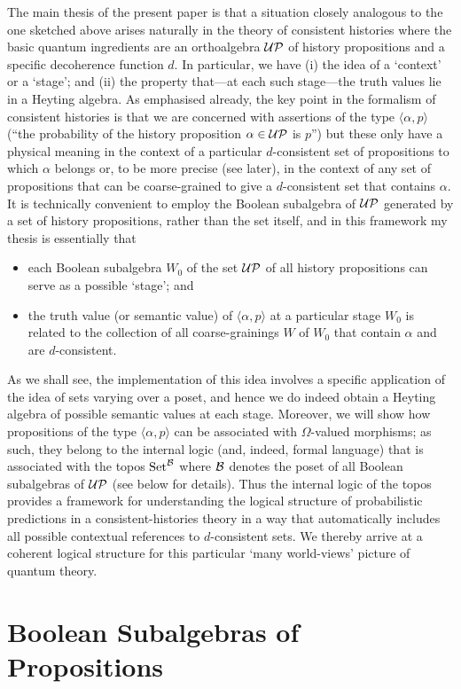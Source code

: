 \documentclass[12pt]{article}
\let\ssection=\section
\renewcommand{\section}{\setcounter{equation}{0}\ssection}
\newcounter{def-number}[section]
\newcommand{\bi}{\begin{itemize}}
\newcommand{\ei}{\end{itemize}}
\renewcommand{\a}{\alpha}                   %
\newcommand{\gp}[2]{\langle#1,#2\rangle}
\newcommand{\B}{{\cal B}}
\newcommand{\Om}{\Omega}
\newcommand{\UP}{{\cal UP}}
\newcommand{\Set}{{\rm Set}}
\newcommand{\SetB}{{\Set^{\cal B}}}
\begin{document}
	The main thesis of the present paper is that a situation closely
analogous to the one sketched above arises naturally in the theory
of consistent histories where the basic quantum ingredients are an
orthoalgebra $\UP$ of history propositions and a specific
decoherence function $d$. In particular, we have (i) the idea of a
`context' or a `stage'; and (ii) the property that---at each such
stage---the truth values lie in a Heyting algebra.  As emphasised
already, the key point in the formalism of consistent histories is
that we are concerned with assertions of the type $\gp{\a}{p}$
(``the probability of the history proposition $\a\in\UP$ is $p$'')
but these only have a physical meaning in the context of a
particular $d$-consistent set of propositions to which $\a$ belongs
or, to be more precise (see later), in the context of any set of
propositions that can be coarse-grained to give a $d$-consistent set
that contains $\a$.  It is technically convenient to employ the
Boolean subalgebra of $\UP$ generated by a set of history
propositions, rather than the set itself, and in this framework my
thesis is essentially that
\bi
	\item each Boolean subalgebra $W_0$ of the set $\UP$ of all history
propositions can serve as a possible `stage'; and

	\item the truth value (or semantic value) of $\gp{\a}{p}$ at a
particular stage $W_0$ is related to the collection of all
coarse-grainings $W$ of $W_0$ that contain $\a$ and are
$d$-consistent.
\ei

	As we shall see, the implementation of this idea involves a
specific application of the idea of sets varying over a poset, and
hence we do indeed obtain a Heyting algebra of possible semantic
values at each stage.  Moreover, we will show how propositions of
the type $\gp{\a}{p}$ can be associated with $\Om$-valued morphisms;
as such, they belong to the internal logic (and, indeed, formal
language) that is associated with the topos $\SetB$ where $\B$
denotes the poset of all Boolean subalgebras of $\UP$ (see below for
details). Thus the internal logic of the topos provides a framework
for understanding the logical structure of probabilistic predictions
in a consistent-histories theory in a way that automatically
includes all possible contextual references to $d$-consistent sets.
We thereby arrive at a coherent logical structure for this
particular `many world-views' picture of quantum theory.


\section{Boolean Subalgebras of Propositions}
\end{document}
